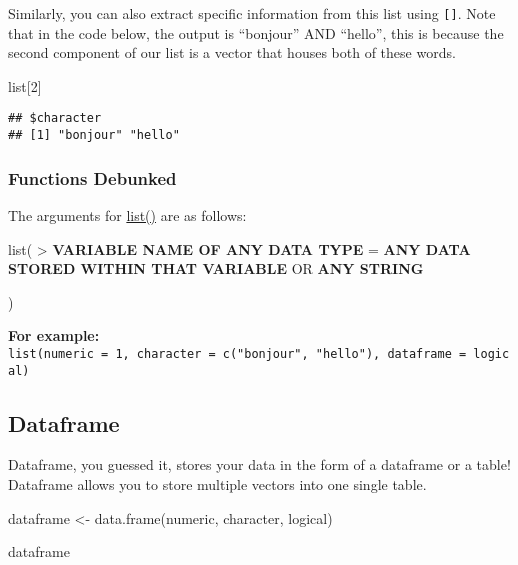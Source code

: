 \documentclass[
]{book}
\newenvironment{Shaded}{\begin{snugshade}}{\end{snugshade}}
\newcommand{\DecValTok}[1]{\textcolor[rgb]{0.00,0.00,0.81}{#1}}
\newcommand{\FunctionTok}[1]{\textcolor[rgb]{0.00,0.00,0.00}{#1}}
\newcommand{\NormalTok}[1]{#1}
\newcommand{\OtherTok}[1]{\textcolor[rgb]{0.56,0.35,0.01}{#1}}
\begin{document}
Similarly, you can also extract specific information from this list using \texttt{{[}{]}}. Note that in the code below, the output is ``bonjour'' AND ``hello'', this is because the second component of our list is a vector that houses both of these words.

\begin{Shaded}
\begin{Highlighting}[]
\NormalTok{list[}\DecValTok{2}\NormalTok{]}
\end{Highlighting}
\end{Shaded}

\begin{verbatim}
## $character
## [1] "bonjour" "hello"
\end{verbatim}

\hypertarget{functions-debunked-1}{%
\subsubsection{Functions Debunked}\label{functions-debunked-1}}

The arguments for \href{https://www.rdocumentation.org/packages/base/versions/3.6.2/topics/list}{list()} are as follows:

list(
\textgreater{} \textbf{VARIABLE NAME OF ANY DATA TYPE} = \textbf{ANY DATA STORED WITHIN THAT VARIABLE} OR \textbf{ANY STRING}

)

\textbf{For example:} \texttt{list(numeric\ =\ 1,\ character\ =\ c("bonjour",\ "hello"),\ dataframe\ =\ logical)}

\hypertarget{dataframe}{%
\subsection{Dataframe}\label{dataframe}}

Dataframe, you guessed it, stores your data in the form of a dataframe or a table! Dataframe allows you to store multiple vectors into one single table.

\begin{Shaded}
\begin{Highlighting}[]
\NormalTok{dataframe }\OtherTok{\textless{}{-}} \FunctionTok{data.frame}\NormalTok{(numeric, character, logical)}
\end{Highlighting}
\end{Shaded}

\begin{Shaded}
\begin{Highlighting}[]
\NormalTok{dataframe}
\end{Highlighting}
\end{Shaded}
\end{document}
